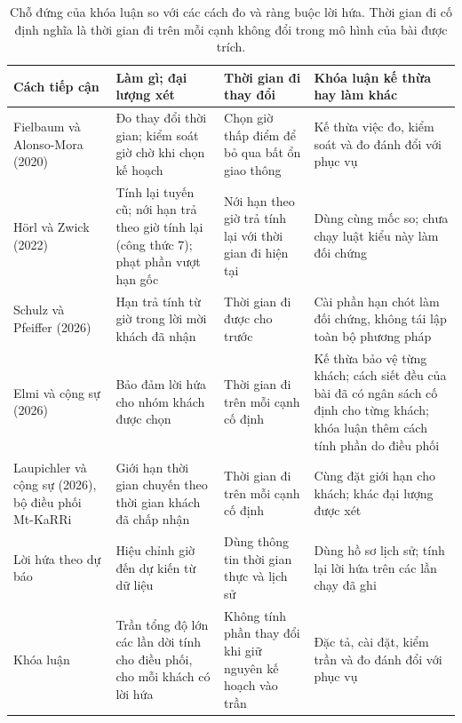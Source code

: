\begin{table}[htbp]
\centering
\caption[Chỗ đứng của khóa luận so với các công trình gần nhất]{Chỗ đứng của khóa luận so với các cách đo và ràng buộc lời hứa. Thời gian đi cố định nghĩa là
thời gian đi trên mỗi cạnh không đổi trong mô hình của bài được trích.}
\label{bang:c1-chodung}
\footnotesize
\begin{tabular}{@{}p{2.8cm}p{4.0cm}p{3.3cm}p{4.5cm}@{}}
\toprule
\textbf{Cách tiếp cận} & \textbf{Làm gì; đại lượng xét} &
\textbf{Thời gian đi thay đổi} & \textbf{Khóa luận kế thừa hay làm khác}\\
\midrule
Fielbaum và Alonso-Mora (2020)~\cite{fielbaum2020}
& Đo thay đổi thời gian; kiểm soát giờ chờ khi chọn kế hoạch
& Chọn giờ thấp điểm để bỏ qua bất ổn giao thông
& Kế thừa việc đo, kiểm soát và đo đánh đổi với phục vụ\\
Hörl và Zwick (2022)~\cite{horl2022}
& Tính lại tuyến cũ; nới hạn trả theo giờ tính lại (công thức 7); phạt phần vượt hạn gốc
& Nới hạn theo giờ trả tính lại với thời gian đi hiện tại
& Dùng cùng mốc so; chưa chạy luật kiểu này làm đối chứng\\
Schulz và Pfeiffer (2026)~\cite{schulz2026}
& Hạn trả tính từ giờ trong lời mời khách đã nhận
& Thời gian đi được cho trước
& Cài phần hạn chót làm đối chứng, không tái lập toàn bộ phương pháp\\
Elmi và cộng sự (2026)~\cite{elmi2026}
& Bảo đảm lời hứa cho nhóm khách được chọn
& Thời gian đi trên mỗi cạnh cố định
& Kế thừa bảo vệ từng khách; cách siết đều của bài đã có ngân sách cố định cho từng khách; khóa luận thêm cách tính phần do điều phối\\
Laupichler và cộng sự (2026), bộ điều phối Mt-KaRRi~\cite{laupichler2026}
& Giới hạn thời gian chuyến theo thời gian khách đã chấp nhận
& Thời gian đi trên mỗi cạnh cố định
& Cùng đặt giới hạn cho khách; khác đại lượng được xét\\
Lời hứa theo dự báo~\cite{hu2022}
& Hiệu chỉnh giờ đến dự kiến từ dữ liệu
& Dùng thông tin thời gian thực và lịch sử
& Dùng hồ sơ lịch sử; tính lại lời hứa trên các lần chạy đã ghi\\
Khóa luận
& Trần tổng độ lớn các lần dời tính cho điều phối, cho mỗi khách có lời hứa
& Không tính phần thay đổi khi giữ nguyên kế hoạch vào trần
& Đặc tả, cài đặt, kiểm trần và đo đánh đổi với phục vụ\\
\bottomrule
\end{tabular}
\end{table}

